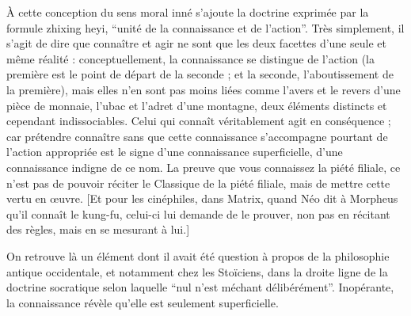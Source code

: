 \documentclass[11pt,a4paper]{article} %
\begin{document}
À cette conception du sens moral inné s'ajoute la doctrine exprimée par la formule
zhixing heyi, ``unité de la connaissance et de l'action''.
Très simplement, il s'agit de
dire que connaître et agir ne sont que les deux facettes d'une seule et même réalité :
conceptuellement, la connaissance se distingue de l'action (la première est le point de
départ de la seconde ; et la seconde, l'aboutissement de la première), mais elles n'en
sont pas moins liées comme l'avers et le revers d'une pièce de monnaie, l'ubac et l'adret
d'une montagne, deux éléments distincts et cependant indissociables.
Celui qui connaît
véritablement agit en conséquence ; car prétendre connaître sans que cette connaissance
s'accompagne pourtant de l'action appropriée est le signe d'une connaissance superficielle, d'une connaissance indigne de ce nom.
La preuve que vous connaissez la piété
filiale, ce n'est pas de pouvoir réciter le Classique de la piété filiale, mais de mettre
cette vertu en œuvre.
[Et pour les cinéphiles, dans Matrix, quand Néo dit à Morpheus
qu'il connaît le kung-fu, celui-ci lui demande de le prouver, non pas en récitant des règles, mais en se mesurant à lui.]

On retrouve là un élément dont il avait été question à propos de la philosophie antique
occidentale, et notamment chez les Stoïciens, dans la droite ligne de la doctrine socratique selon laquelle ``nul n'est méchant délibérément''.
Inopérante, la connaissance
révèle qu'elle est seulement superficielle.
\end{document}
